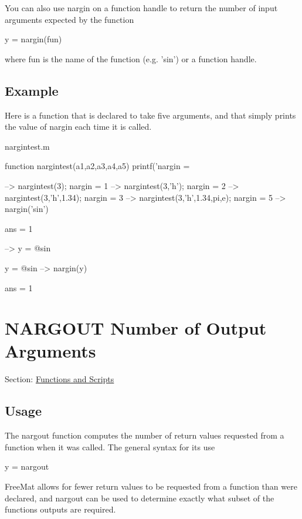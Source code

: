 You can also use {\ttfamily nargin} on a function handle to return the number of input arguments expected by the function \begin{DoxyVerb}  y = nargin(fun)
\end{DoxyVerb}
 where {\ttfamily fun} is the name of the function (e.\-g. {\ttfamily 'sin'}) or a function handle. \hypertarget{variables_struct_Example}{}\subsection{Example}\label{variables_struct_Example}
Here is a function that is declared to take five arguments, and that simply prints the value of {\ttfamily nargin} each time it is called.

\begin{DoxyVerb}     nargintest.m
\end{DoxyVerb}



\begin{DoxyVerbInclude}
function nargintest(a1,a2,a3,a4,a5)
  printf('nargin = %
\end{DoxyVerbInclude}



\begin{DoxyVerbInclude}
--> nargintest(3);
nargin = 1
--> nargintest(3,'h');
nargin = 2
--> nargintest(3,'h',1.34);
nargin = 3
--> nargintest(3,'h',1.34,pi,e);
nargin = 5
--> nargin('sin')

ans = 
 1 

--> y = @sin

y = 
 @sin
--> nargin(y)

ans = 
 1 
\end{DoxyVerbInclude}
 \hypertarget{functions_nargout}{}\section{N\-A\-R\-G\-O\-U\-T Number of Output Arguments}\label{functions_nargout}
Section\-: \hyperlink{sec_functions}{Functions and Scripts} \hypertarget{vtkwidgets_vtkxyplotwidget_Usage}{}\subsection{Usage}\label{vtkwidgets_vtkxyplotwidget_Usage}
The {\ttfamily nargout} function computes the number of return values requested from a function when it was called. The general syntax for its use \begin{DoxyVerb}   y = nargout
\end{DoxyVerb}
 Free\-Mat allows for fewer return values to be requested from a function than were declared, and {\ttfamily nargout} can be used to determine exactly what subset of the functions outputs are required.

